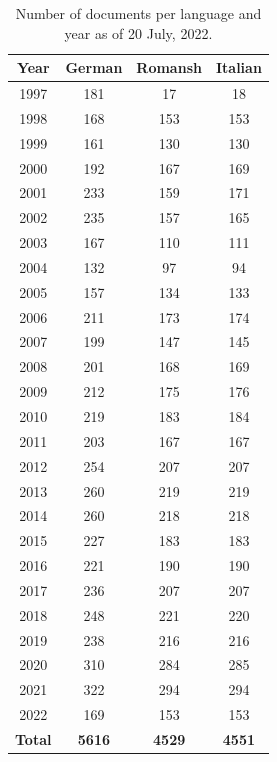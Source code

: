 \begin{table}
\centering
\begin{tabular}{cccc}
\toprule
Year & German & Romansh & Italian\\
\midrule
1997 & 181 & 17 & 18\\ 
1998 & 168 & 153 & 153\\ 
1999 & 161 & 130 & 130\\ 
2000 & 192 & 167 & 169\\ 
2001 & 233 & 159 & 171\\ 
2002 & 235 & 157 & 165\\ 
2003 & 167 & 110 & 111\\ 
2004 & 132 & 97 & 94\\ 
2005 & 157 & 134 & 133\\ 
2006 & 211 & 173 & 174\\ 
2007 & 199 & 147 & 145\\ 
2008 & 201 & 168 & 169\\ 
2009 & 212 & 175 & 176\\ 
2010 & 219 & 183 & 184\\ 
2011 & 203 & 167 & 167\\ 
2012 & 254 & 207 & 207\\ 
2013 & 260 & 219 & 219\\ 
2014 & 260 & 218 & 218\\ 
2015 & 227 & 183 & 183\\ 
2016 & 221 & 190 & 190\\ 
2017 & 236 & 207 & 207\\ 
2018 & 248 & 221 & 220\\ 
2019 & 238 & 216 & 216\\ 
2020 & 310 & 284 & 285\\ 
2021 & 322 & 294 & 294\\ 
2022 & 169 & 153 & 153\\
\midrule
\textbf{Total} & \textbf{5616}	&\textbf{4529}&	\textbf{4551}\\
\bottomrule
\end{tabular}
\caption[Number of documents per language and year]{Number of documents per language and year as of 20 July, 2022.}
\label{tab:docs-per-lang}
\end{table}


